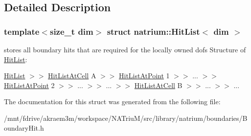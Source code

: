 \subsection{Detailed Description}
\subsubsection*{template$<$size\_\-t dim$>$ struct natrium::HitList$<$ dim $>$}

stores all boundary hits that are required for the locally owned dofs Structure of \hyperlink{structnatrium_1_1HitList}{HitList}:
\begin{DoxyItemize}
\item \hyperlink{structnatrium_1_1HitList}{HitList} $>$$>$ \hyperlink{structnatrium_1_1HitListAtCell}{HitListAtCell} A $>$$>$ \hyperlink{structnatrium_1_1HitListAtPoint}{HitListAtPoint} 1 $>$$>$ ... $>$$>$ \hyperlink{structnatrium_1_1HitListAtPoint}{HitListAtPoint} 2 $>$$>$ ... $>$$>$ ... $>$$>$ \hyperlink{structnatrium_1_1HitListAtCell}{HitListAtCell} B $>$$>$ ... $>$$>$ ... 
\end{DoxyItemize}

The documentation for this struct was generated from the following file:\begin{DoxyCompactItemize}
\item 
/mnt/fdrive/akraem3m/workspace/NATriuM/src/library/natrium/boundaries/BoundaryHit.h\end{DoxyCompactItemize}
